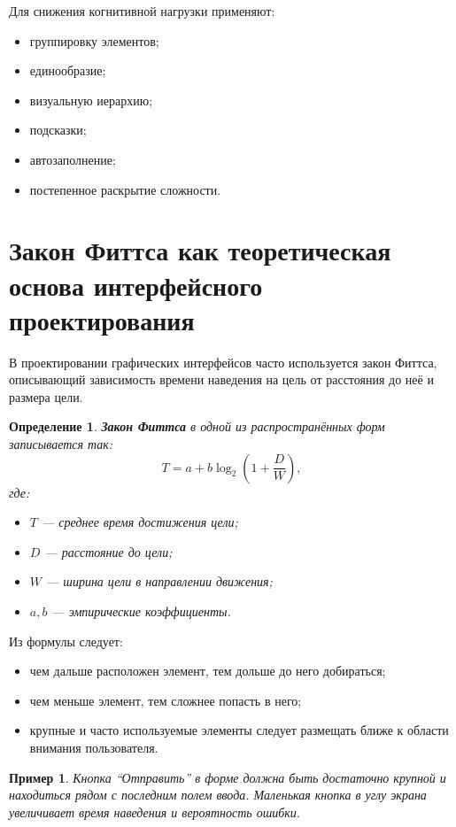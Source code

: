 \documentclass[12pt,a4paper]{article}
\newtheorem{definition}{Определение}
\newtheorem{example}{Пример}
\begin{document}
Для снижения когнитивной нагрузки применяют:
\begin{itemize}
    \item группировку элементов;
    \item единообразие;
    \item визуальную иерархию;
    \item подсказки;
    \item автозаполнение;
    \item постепенное раскрытие сложности.
\end{itemize}

\section{Закон Фиттса как теоретическая основа интерфейсного проектирования}

В проектировании графических интерфейсов часто используется закон Фиттса, описывающий зависимость времени наведения на цель от расстояния до неё и размера цели.

\begin{definition}
\textbf{Закон Фиттса} в одной из распространённых форм записывается так:
\[
T = a + b \log_2\left(1 + \frac{D}{W}\right),
\]
где:
\begin{itemize}
    \item $T$ --- среднее время достижения цели;
    \item $D$ --- расстояние до цели;
    \item $W$ --- ширина цели в направлении движения;
    \item $a,b$ --- эмпирические коэффициенты.
\end{itemize}
\end{definition}

Из формулы следует:
\begin{itemize}
    \item чем дальше расположен элемент, тем дольше до него добираться;
    \item чем меньше элемент, тем сложнее попасть в него;
    \item крупные и часто используемые элементы следует размещать ближе к области внимания пользователя.
\end{itemize}

\begin{example}
Кнопка ``Отправить'' в форме должна быть достаточно крупной и находиться рядом с последним полем ввода. Маленькая кнопка в углу экрана увеличивает время наведения и вероятность ошибки.
\end{example}
\end{document}
